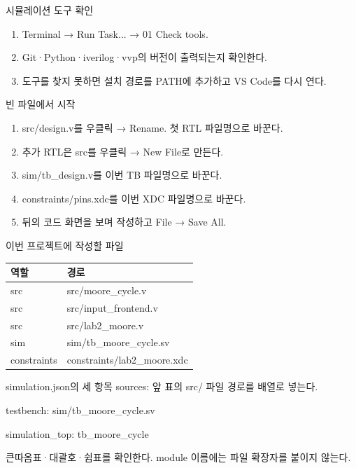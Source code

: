 \begin{frame}{시뮬레이션 도구 확인}
\small
\begin{enumerate}
\item Terminal → Run Task... → 01 Check tools.
\item Git·Python·iverilog·vvp의 버전이 출력되는지 확인한다.
\item 도구를 찾지 못하면 설치 경로를 PATH에 추가하고 VS Code를 다시 연다.
\end{enumerate}
\end{frame}

\begin{frame}{빈 파일에서 시작}
\small
\begin{enumerate}
\item src/design.v를 우클릭 → Rename. 첫 RTL 파일명으로 바꾼다.
\item 추가 RTL은 src를 우클릭 → New File로 만든다.
\item sim/tb\_design.v를 이번 TB 파일명으로 바꾼다.
\item constraints/pins.xdc를 이번 XDC 파일명으로 바꾼다.
\item 뒤의 코드 화면을 보며 작성하고 File → Save All.
\end{enumerate}
\end{frame}

\begin{frame}{이번 프로젝트에 작성할 파일}
\small
\begin{center}\renewcommand{\arraystretch}{1.55}\begin{tabular}{ll}
역할 & 경로\\\hline
src & src/moore\_cycle.v\\
src & src/input\_frontend.v\\
src & src/lab2\_moore.v\\
sim & sim/tb\_moore\_cycle.sv\\
constraints & constraints/lab2\_moore.xdc\\
\end{tabular}\end{center}
\end{frame}

\begin{frame}{simulation.json의 세 항목}
\small
sources: 앞 표의 src/ 파일 경로를 배열로 넣는다.\par\vspace{0.26cm}testbench: sim/tb\_moore\_cycle.sv\par\vspace{0.26cm}simulation\_top: tb\_moore\_cycle\par\vspace{0.26cm}큰따옴표·대괄호·쉼표를 확인한다. module 이름에는 파일 확장자를 붙이지 않는다.\par
\end{frame}

